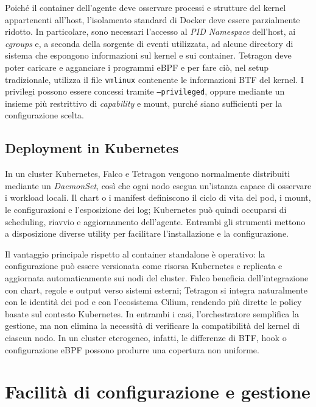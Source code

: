 \documentclass[12pt,a4paper,openright,twoside]{book}
\begin{document}
Poiché il container dell'agente deve osservare processi e strutture del kernel appartenenti all'host, l'isolamento standard di Docker deve essere parzialmente ridotto. In particolare, sono necessari l'accesso al \textit{PID Namespace} dell'host, ai \textit{cgroups} e, a seconda della sorgente di eventi utilizzata, ad alcune directory di sistema che espongono informazioni sul kernel e sui container. Tetragon deve poter caricare e agganciare i programmi eBPF e per fare ciò, nel setup tradizionale, utilizza il file \texttt{vmlinux} contenente le informazioni BTF del kernel. I privilegi possono essere concessi tramite \texttt{--privileged}, oppure mediante un insieme più restrittivo di \textit{capability} e mount, purché siano sufficienti per la configurazione scelta. \cite{falco-docs-install,tetragon-docs-install,tetragon-docs-install-faq}

\subsection{Deployment in Kubernetes}
In un cluster Kubernetes, Falco e Tetragon vengono normalmente distribuiti mediante un \textit{DaemonSet}, così che ogni nodo esegua un'istanza capace di osservare i workload locali. Il chart o i manifest definiscono il ciclo di vita del pod, i mount, le configurazioni e l'esposizione dei log; Kubernetes può quindi occuparsi di scheduling, riavvio e aggiornamento dell'agente. Entrambi gli strumenti mettono a disposizione diverse utility per facilitare l'installazione e la configurazione. \cite{falco-docs-setup,tetragon-docs-install}

Il vantaggio principale rispetto al container standalone è operativo: la configurazione può essere versionata come risorsa Kubernetes e replicata e aggiornata automaticamente sui nodi del cluster. Falco beneficia dell'integrazione con chart, regole e output verso sistemi esterni; Tetragon si integra naturalmente con le identità dei pod e con l'ecosistema Cilium, rendendo più dirette le policy basate sul contesto Kubernetes. In entrambi i casi, l'orchestratore semplifica la gestione, ma non elimina la necessità di verificare la compatibilità del kernel di ciascun nodo. In un cluster eterogeneo, infatti, le differenze di BTF, hook o configurazione eBPF possono produrre una copertura non uniforme.

\section{Facilità di configurazione e gestione}
\label{sec:configuration-ease}
\end{document}
